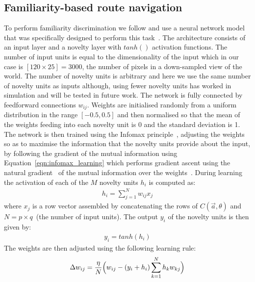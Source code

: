 \documentclass[letterpaper]{article}
\begin{document}
\subsection{Familiarity-based route navigation}
\label{sec:familiarity_infomax}
To perform familiarity discrimination we follow \citet{Baddeley2012} and use a neural network model that was specifically designed to perform this task~\citep{Lulham2011}. 
The architecture consists of an input layer and a novelty layer with $tanh()$ activation functions. 
The number of input units is equal to the dimensionality of the input which in our case is $[120 \times 25]=3000$, the number of pixels in a down-sampled view of the world. 
The number of novelty units is arbitrary and here we use the same number of novelty units as inputs although, using fewer novelty units has worked in simulation and will be tested in future work.
The network is fully connected by feedforward connections $w_{ij}$. 
Weights are initialised randomly from a uniform distribution in the range $[-0.5,0.5]$ and then normalised so that the mean of the weights feeding into each novelty unit is \num{0} and the standard deviation is \num{1}. 
The network is then trained using the Infomax principle~\citep{Bell1995}, adjusting the weights so as to maximise the information that the novelty units provide about the input, by following the gradient of the mutual information using Equation~\ref{eqn:infomax_learning} which performs gradient ascent using the natural gradient~\citep{Amari1998} of the mutual information over the weights~\citep{Lee1997}.
During learning the activation of each of the $M$ novelty units $h_{i}$ is computed as:
%
\begin{align}
    h_{i}=\sum\limits_{j=1}^N w_{ij}x_{j}   \label{eqn:infomax_activation}
\end{align}
%
where $x_{j}$ is a row vector assembled by concatenating the rows of $C(\vec{a}, \theta)$ and $N=p \times q$~(the number of input units).
The output $y_{i}$ of the novelty units is then given by:
%
\begin{align}
    y_{i}=tanh(h_{i})   \label{eqn:infomax_output}
\end{align}
%
The weights are then adjusted using the following learning rule: 
%
\begin{align}
    \Delta w_{ij}=\frac{\eta}{N} \Bigl( w_{ij} - (y_{i} + h_{i}) \sum\limits_{k=1}^N h_{k}w_{kj} \Bigr)   \label{eqn:infomax_learning}
\end{align}
\end{document}

